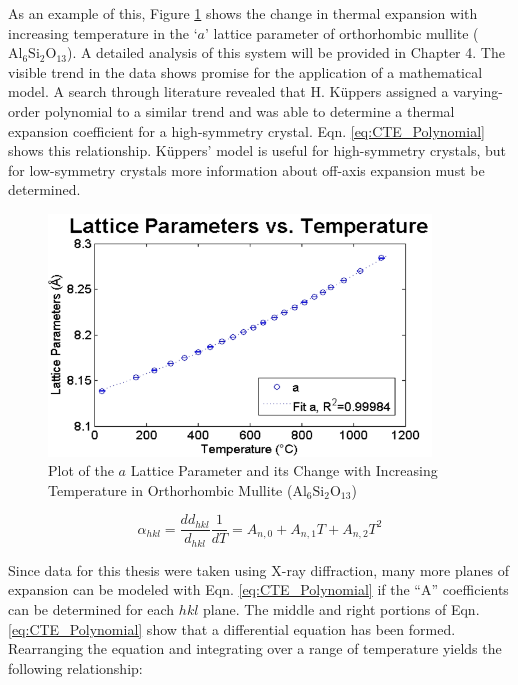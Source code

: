 As an example of this, Figure \ref{fig:Latparam_Trend} shows the change in thermal expansion with increasing temperature in the `$a$' lattice parameter of orthorhombic mullite ($\text{Al}_6 \text{Si}_2 \text{O}_{13}$).  A detailed analysis of this system will be provided in Chapter 4.  The visible trend in the data shows promise for the application of a mathematical model.  A search through literature revealed that H. K\"{u}ppers assigned a varying-order polynomial to a similar trend and was able to determine a thermal expansion coefficient for a high-symmetry crystal.  Eqn. \ref{eq:CTE_Polynomial} shows this relationship.  K\"{u}ppers' model is useful for high-symmetry crystals, but for low-symmetry crystals more information about off-axis expansion must be determined.

\begin{figure}[htbp]
 \begin{center}
 \includegraphics[width=4in,bb=0 0 358 226,keepaspectratio=true]{./Figures/Mullite_Latparams.png}
 \end{center}
 \caption{Plot of the $a$ Lattice Parameter and its Change with Increasing Temperature in Orthorhombic Mullite ($\text{Al}_6 \text{Si}_2 \text{O}_{13}$)}
 \label{fig:Latparam_Trend}
\end{figure}

\begin{equation}
 \alpha_{hkl} = \frac{dd_{hkl}}{d_{hkl}} \frac{1}{dT} = A_{n,0} + A_{n,1}T + A_{n,2}T^2
 \label{eq:CTE_Polynomial}
\end{equation}

Since data for this thesis were taken using X-ray diffraction, many more planes of expansion can be modeled with Eqn. \ref{eq:CTE_Polynomial} if the ``A'' coefficients can be determined for each $hkl$ plane.  The middle and right portions of Eqn. \ref{eq:CTE_Polynomial} show that a differential equation has been formed.  Rearranging the equation and integrating over a range of temperature yields the following relationship:

